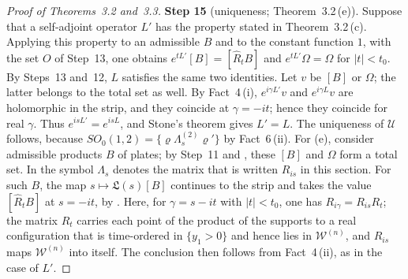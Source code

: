 \documentclass[11pt,letterpaper,reqno]{amsart}
\theoremstyle{definition}
\begin{document}
\begin{proof}[Proof of Theorems~3.2 and~3.3]
\textbf{Step 15} (uniqueness; Theorem~3.2\,(e)).
Suppose that a self-adjoint operator $L'$ has the property stated in Theorem~3.2\,(c).
Applying this property to an admissible $B$ and to the constant function $1$, with the set $O$ of Step~13, one obtains $e^{tL'}[B]=[\hat R_tB]$ and $e^{tL'}\Omega=\Omega$ for $|t|<t_0$.
By Steps~13 and~12, $L$ satisfies the same two identities.
Let $v$ be $[B]$ or $\Omega$; the latter belongs to the total set as well.
By Fact~4\,(i), $e^{i\gamma L'}v$ and $e^{i\gamma L}v$ are holomorphic in the strip, and they coincide at $\gamma=-it$; hence they coincide for real $\gamma$.
Thus $e^{isL'}=e^{isL}$, and Stone's theorem gives $L'=L$.
The uniqueness of $\mathcal U$ follows, because $SO_0(1,2)=\{\varrho\Lambda^{(2)}_s\varrho'\}$ by Fact~6\,(ii).
For (e), consider admissible products $B$ of plates; by Step~11 and \cite[Lemma~14.8]{QEDII}, these $[B]$ and $\Omega$ form a total set.
In \cite[Section~14.2]{QEDII} the symbol $\Lambda_s$ denotes the matrix that is written $R_{is}$ in this section.
For such $B$, the map $s\mapsto\mathfrak L(s)[B]$ continues to the strip and takes the value $[\hat R_tB]$ at $s=-it$, by \cite[Propositions~14.22\,(b), (c), 14.47\,(c), Lemmas~14.6\,(a), 14.9\,(b), (c), Definition~14.21]{QEDII}.
Here, for $\gamma=s-it$ with $|t|<t_0$, one has $R_{i\gamma}=R_{is}R_t$; the matrix $R_t$ carries each point of the product of the supports to a real configuration that is time-ordered in $\{y_1>0\}$ and hence lies in $\mathcal W^{(n)}$, and $R_{is}$ maps $\mathcal W^{(n)}$ into itself.
The conclusion then follows from Fact~4\,(ii), as in the case of $L'$.


\end{proof}
\end{document}
